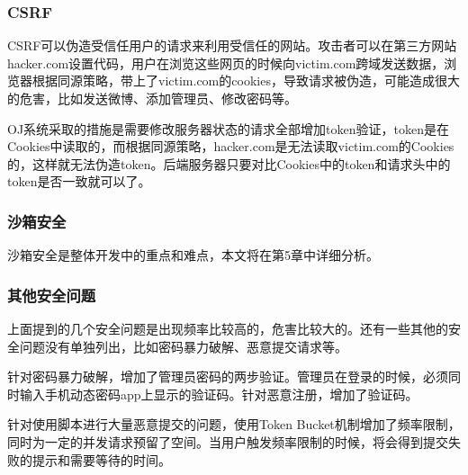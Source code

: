 \subsubsection{CSRF}

CSRF可以伪造受信任用户的请求来利用受信任的网站。攻击者可以在第三方网站hacker.com设置代码，用户在浏览这些网页的时候向victim.com跨域发送数据，浏览器根据同源策略，带上了victim.com的cookies，导致请求被伪造，可能造成很大的危害，比如发送微博、添加管理员、修改密码等。

OJ系统采取的措施是需要修改服务器状态的请求全部增加token验证，token是在Cookies中读取的，而根据同源策略，hacker.com是无法读取victim.com的Cookies的，这样就无法伪造token。后端服务器只要对比Cookies中的token和请求头中的token是否一致就可以了。

\subsubsection{沙箱安全}

沙箱安全是整体开发中的重点和难点，本文将在第5章中详细分析。
     
\subsubsection{其他安全问题}

上面提到的几个安全问题是出现频率比较高的，危害比较大的。还有一些其他的安全问题没有单独列出，比如密码暴力破解、恶意提交请求等。

针对密码暴力破解，增加了管理员密码的两步验证。管理员在登录的时候，必须同时输入手机动态密码app上显示的验证码。针对恶意注册，增加了验证码。

针对使用脚本进行大量恶意提交的问题，使用Token Bucket机制增加了频率限制，同时为一定的并发请求预留了空间。当用户触发频率限制的时候，将会得到提交失败的提示和需要等待的时间。
